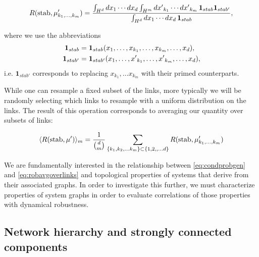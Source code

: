 \begin{widetext}
\begin{equation}\label{eq:condprobgen}
 R (\mathrm{stab}, \mu'_{k_1, \ldots, k_m}) =
  \frac{\int_{H^d} dx_1 \cdots dx_d \int_{H^m} {dx'}_{k_1} \cdots {dx'}_{k_m}\,
    \mathbf{1}_{stab} \mathbf{1}_{stab'}}
  {\int_{H^d} dx_1 \cdots dx_d  \, \mathbf{1}_{stab}},
\end{equation}
\end{widetext}
where we use the abbreviations
\begin{align*}
\mathbf{1}_{stab} &= \mathbf{1}_{stab}(x_1, \ldots, x_{k_1}, \ldots, x_{k_m}, \ldots, x_d), \\
\mathbf{1}_{stab'} &= \mathbf{1}_{stab'}(x_1, \ldots, {x'}_{k_1}, \ldots, {x'}_{k_m},  \ldots, x_d),
\end{align*}
i.e. $\mathbf{1}_{stab'}$ corresponds to replacing $x_{k_1}, \ldots x_{k_m}$ with their primed counterparts.

While one can resample a fixed subset of the links, more typically we will be randomly selecting which links to resample with a uniform distribution on the links.  The result of this operation corresponds to averaging our quantity over subsets of links:
\begin{widetext}
\begin{equation}\label{eq:robavgoverlinks}
\langle R (\hbox{stab}, \mu') \rangle_m =
\frac{1}{\binom{d}{m}}
\sum_{\{k_1, k_2, \ldots k_m\} \subset \{1, 2,, \ldots d\}}
R (\hbox{stab}, \mu'_{k_1, \ldots, k_m})
\end{equation}
\end{widetext}
We are fundamentally interested in the relationship between \ref{eq:condprobgen} and \ref{eq:robavgoverlinks} and topological properties of systems that derive from their associated graphs. In order to investigate this further, we must characterize properties of system graphs in order to evaluate correlations of those properties with dynamical robustness.

\subsection{Network hierarchy and strongly connected components}

